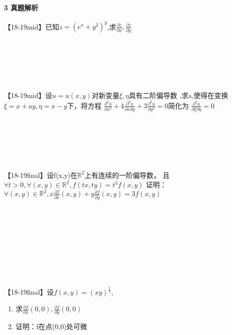 \documentclass[12pt]{scrartcl}
\begin{document}
{\paragraph*{\large 3 真题解析}\leavevmode \newline
【18-19mid】已知$z=(e^x+y^2)^y$,求$\frac{\partial z}{\partial x},
\frac{\partial z }{\partial y}$ \leavevmode \newline
\\
\\
\\
\\
\\
\\
\\
【18-19mid】设$u=u(x,y)$对新变量$\xi,\eta $具有二阶偏导数
,求a,使得在变换$\xi =x+ay,\eta =x-y$下，将方程
$\frac{\partial ^2 u}{\partial x^2}+
4\frac{\partial ^2 u}{\partial x\partial y}
+3\frac{\partial ^2 u}{\partial y^2}=0  $简化为
$\frac{\partial ^2 u}{\partial \xi \partial \eta }=0 $     \leavevmode \newline
\\
\\
\\
\\
\\
\\
\\
【18-19final】设f(x,y)在$\mathbb{R} ^2$上有连续的一阶偏导数，
且$\forall t>0,\forall(x,y)\in\mathbb{R} ^2,f(tx,ty)=t^3f(x,y) $
证明：
$\forall(x,y)\in\mathbb{R} ^2,x\frac{\partial f}{\partial x}(x,y)+
y\frac{\partial f}{\partial y}(x,y)=3f(x,y) $\leavevmode \newline
\\
\\
\\
\\
\\
\\
\\
\\
\\
\\
【18-19final】设$f(x,y)=(xy)^{\frac{2}{3}}$,
\begin{enumerate}
    \item 求$\frac{\partial f}{\partial x}(0,0),
    \frac{\partial f}{\partial y}(0,0)$
    \item 证明：f在点(0,0)处可微
\end{enumerate}\leavevmode \newline
\\
\\
}
\end{document}
